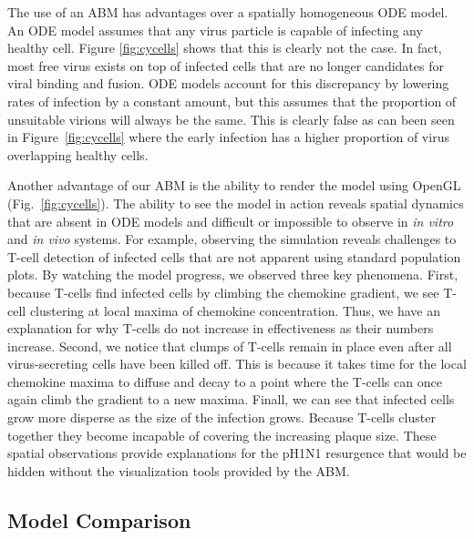 \documentclass[10pt]{article}
\begin{document}
The use of an ABM has advantages over a spatially homogeneous ODE model.  An ODE model assumes that any virus particle is capable of infecting any healthy cell.  Figure \ref{fig:cycells} shows that this is clearly not the case.  In fact, most free virus exists on top of infected cells that are no longer candidates for viral binding and fusion.  ODE models account for this discrepancy by lowering rates of infection by a constant amount, but this assumes that the proportion of unsuitable virions will always be the same.  This is clearly false as can been seen in Figure~\ref{fig:cycells} where the early infection has a higher proportion of virus overlapping healthy cells.

Another advantage of our ABM is the ability to render the model using OpenGL (Fig.~\ref{fig:cycells}).  The ability to see the model in action reveals spatial dynamics that are absent in ODE models and difficult or impossible to observe in \textit{in vitro} and \textit{in vivo} systems.  For example, observing the simulation reveals challenges to T-cell detection of infected cells that are not apparent using standard population plots.  By watching the model progress, we observed three key phenomena.  First, because T-cells find infected cells by climbing the chemokine gradient, we see T-cell clustering at local maxima of chemokine concentration.  Thus, we have an explanation for why T-cells do not increase in effectiveness as their numbers increase.  Second, we notice that clumps of T-cells remain in place even after all virus-secreting cells have been killed off.  This is because it takes time for the local chemokine maxima to diffuse and decay to a point where the T-cells can once again climb the gradient to a new maxima.  Finall, we can see that infected cells grow more disperse as the size of the infection grows.  Because T-cells cluster together they become incapable of covering the increasing plaque size.  These spatial observations provide explanations for the pH1N1 resurgence that would be hidden without the visualization tools provided by the ABM.


\subsection*{Model Comparison}
\end{document}
